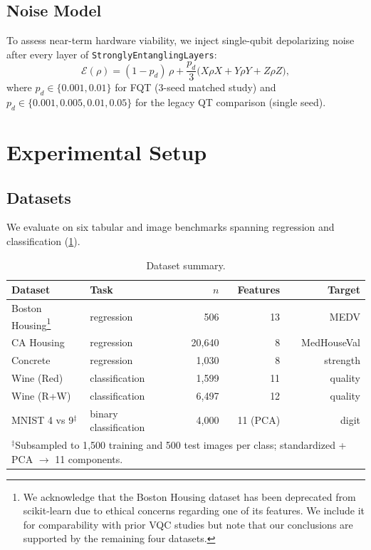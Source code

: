 \documentclass[10pt,conference]{IEEEtran}
\begin{document}
\subsection{Noise Model}

To assess near-term hardware viability, we inject single-qubit depolarizing noise after every layer of \texttt{StronglyEntanglingLayers}:
\begin{equation}
    \mathcal{E}(\rho) = (1 - p_d)\,\rho + \frac{p_d}{3}\bigl(X\rho X + Y\rho Y + Z\rho Z\bigr),
\end{equation}
where $p_d \in \{0.001, 0.01\}$ for FQT (3-seed matched study) and $p_d \in \{0.001, 0.005, 0.01, 0.05\}$ for the legacy QT comparison (single seed).

\section{Experimental Setup}
\label{sec:setup}

\subsection{Datasets}

We evaluate on six tabular and image benchmarks spanning regression and classification (\cref{tab:datasets}).

\begin{table}[t]
\centering
\caption{Dataset summary.}
\label{tab:datasets}
\small
\begin{tabular}{llrrr}
\toprule
Dataset & Task & $n$ & Features & Target \\
\midrule
Boston Housing\footnote{We acknowledge that the Boston Housing dataset has been deprecated from scikit-learn due to ethical concerns regarding one of its features. We include it for comparability with prior VQC studies but note that our conclusions are supported by the remaining four datasets.} & regression & 506 & 13 & MEDV \\
CA Housing & regression & 20{,}640 & 8 & MedHouseVal \\
Concrete & regression & 1{,}030 & 8 & strength \\
Wine (Red) & classification & 1{,}599 & 11 & quality \\
Wine (R+W) & classification & 6{,}497 & 12 & quality \\
MNIST 4 vs 9$^{\ddagger}$ & binary classification & 4{,}000 & 11 (PCA) & digit \\
\bottomrule
\multicolumn{5}{l}{\scriptsize $^{\ddagger}$Subsampled to 1{,}500 training and 500 test images per class; standardized + PCA $\to$ 11 components.}
\end{tabular}
\vspace{-10pt}
\end{table}
\end{document}
